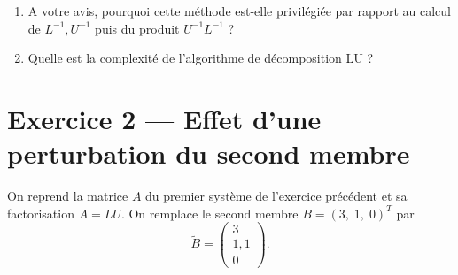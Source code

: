\begin{enumerate}
{\begin{solution}
            Finalement,  
            \[
                M = \frac{1}{4} \begin{pmatrix} -1 & -1 & 3 \\ -1 & 3 & -1 \\ 3 & -1 & -1 \end{pmatrix}
            \]
            On peut vérifier que $A M = I$.
        \end{solution}
    }{}
    \item A votre avis, pourquoi cette méthode est-elle privilégiée par rapport au calcul de $L^{-1}, U^{-1}$ puis du produit $U^{-1}L^{-1}$ ?

    \item Quelle est la complexité de l'algorithme de décomposition LU ?
\end{enumerate}

\vspace{2em}
\section*{Exercice 2 --- Effet d'une perturbation du second membre}

On reprend la matrice $A$ du premier système de l'exercice précédent
et sa factorisation $A = LU$.
On remplace le second membre $B = (3,\;1,\;0)^T$ par
\[
  \tilde{B} = \begin{pmatrix} 3\\ 1{,}1\\ 0 \end{pmatrix}.
\]


